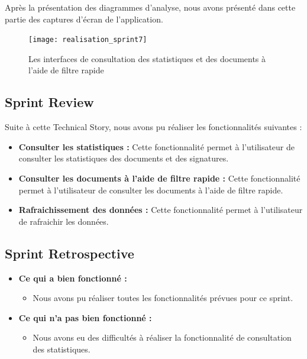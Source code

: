 Après la présentation des diagrammes d'analyse, nous avons présenté dans cette partie des captures d'écran de l'application.

\begin{figure}[H]
  \centering
  \texttt{[image: realisation\_sprint7]}
  \caption{Les interfaces de consultation des statistiques et des documents à l'aide de filtre rapide}
  \label{fig:realisation_sprint7}
\end{figure}

\subsection{Sprint Review}
Suite à cette Technical Story, nous avons pu réaliser les fonctionnalités suivantes :
\begin{itemize}
  \item \textbf{Consulter les statistiques :} Cette fonctionnalité permet à l'utilisateur de consulter les statistiques des documents et des signatures.
  \item \textbf{Consulter les documents à l'aide de filtre rapide :} Cette fonctionnalité permet à l'utilisateur de consulter les documents à l'aide de filtre rapide.
  \item \textbf{Rafraichissement des données :} Cette fonctionnalité permet à l'utilisateur de rafraichir les données.
\end{itemize}

\subsection{Sprint Retrospective}

\begin{itemize}
  \item \textbf{Ce qui a bien fonctionné :}
  \begin{itemize}
    \item Nous avons pu réaliser toutes les fonctionnalités prévues pour ce sprint.
  \end{itemize}

    \item \textbf{Ce qui n'a pas bien fonctionné :}
    \begin{itemize}
      \item Nous avons eu des difficultés à réaliser la fonctionnalité de consultation des statistiques.
    \end{itemize}
      
\end{itemize}

